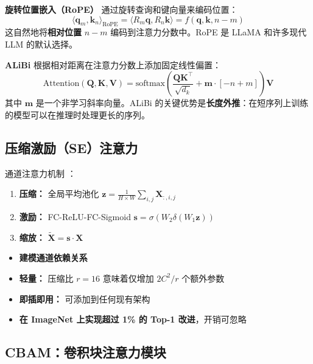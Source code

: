 \textbf{旋转位置嵌入（RoPE）} \cite{su2021roformer} 通过旋转查询和键向量来编码位置：
\begin{equation}
\langle \mathbf{q}_m, \mathbf{k}_n \rangle_{\text{RoPE}} = \langle R_m \mathbf{q}, R_n \mathbf{k} \rangle = f(\mathbf{q}, \mathbf{k}, n - m)
\end{equation}
这自然地将\textbf{相对位置} $n - m$ 编码到注意力分数中。RoPE 是 LLaMA 和许多现代 LLM 的默认选择。

\textbf{ALiBi} \cite{press2022train} 根据相对距离在注意力分数上添加固定线性偏置：
\begin{equation}
\text{Attention}(\mathbf{Q}, \mathbf{K}, \mathbf{V}) = \text{softmax}\left(\frac{\mathbf{Q}\mathbf{K}^\top}{\sqrt{d_k}} + \mathbf{m} \cdot [-n+m]\right)\mathbf{V}
\end{equation}
其中 $\mathbf{m}$ 是一个非学习斜率向量。ALiBi 的关键优势是\textbf{长度外推}：在短序列上训练的模型可以在推理时处理更长的序列。

\subsection{压缩激励（SE）注意力}

通道注意力机制 \cite{hu2018squeeze}：
\begin{enumerate}
    \item \textbf{压缩：} 全局平均池化 $\mathbf{z} = \frac{1}{H\times W}\sum_{i,j}\mathbf{X}_{:,i,j}$
    \item \textbf{激励：} FC-ReLU-FC-Sigmoid $\mathbf{s} = \sigma(W_2\delta(W_1\mathbf{z}))$
    \item \textbf{缩放：} $\tilde{\mathbf{X}} = \mathbf{s} \cdot \mathbf{X}$
\end{enumerate}

\begin{properties}[SE 块]
\begin{itemize}
    \item \textbf{建模通道依赖关系}
    \item \textbf{轻量：} 压缩比 $r = 16$ 意味着仅增加 $2C^2/r$ 个额外参数
    \item \textbf{即插即用：} 可添加到任何现有架构
    \item \textbf{在 ImageNet 上实现超过 1\% 的 Top-1 改进}，开销可忽略
\end{itemize}
\end{properties}

\subsection{CBAM：卷积块注意力模块}

